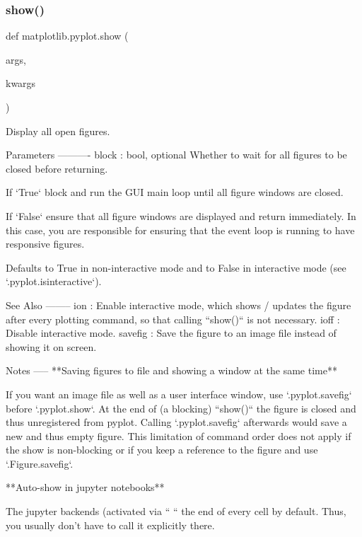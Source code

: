 \mbox{\label{namespacematplotlib_1_1pyplot_a8fc9734aaaf07cb42642b5552c04a3e7}} 
\subsubsection{\texorpdfstring{show()}{show()}}
{\footnotesize\ttfamily def matplotlib.\+pyplot.\+show (\begin{DoxyParamCaption}\item[{}]{args,  }\item[{}]{kwargs }\end{DoxyParamCaption})}

\begin{DoxyVerb}Display all open figures.

Parameters
----------
block : bool, optional
    Whether to wait for all figures to be closed before returning.

    If `True` block and run the GUI main loop until all figure windows
    are closed.

    If `False` ensure that all figure windows are displayed and return
    immediately.  In this case, you are responsible for ensuring
    that the event loop is running to have responsive figures.

    Defaults to True in non-interactive mode and to False in interactive
    mode (see `.pyplot.isinteractive`).

See Also
--------
ion : Enable interactive mode, which shows / updates the figure after
      every plotting command, so that calling ``show()`` is not necessary.
ioff : Disable interactive mode.
savefig : Save the figure to an image file instead of showing it on screen.

Notes
-----
**Saving figures to file and showing a window at the same time**

If you want an image file as well as a user interface window, use
`.pyplot.savefig` before `.pyplot.show`. At the end of (a blocking)
``show()`` the figure is closed and thus unregistered from pyplot. Calling
`.pyplot.savefig` afterwards would save a new and thus empty figure. This
limitation of command order does not apply if the show is non-blocking or
if you keep a reference to the figure and use `.Figure.savefig`.

**Auto-show in jupyter notebooks**

The jupyter backends (activated via ``%
``%
the end of every cell by default. Thus, you usually don't have to call it
explicitly there.
\end{DoxyVerb}
 \mbox{\label{namespacematplotlib_1_1pyplot_af49ef35beefd4f81f26fb8021a640e53}} 
